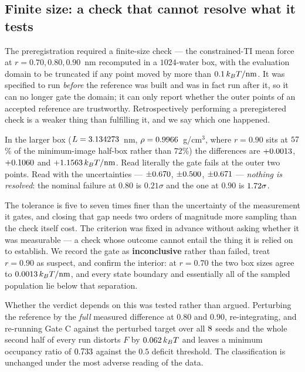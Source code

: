 \subsection{Finite size: a check that cannot resolve what it tests}

The preregistration required a finite-size check --- the constrained-TI mean force at
$r = 0.70, 0.80, 0.90$~nm recomputed in a $1024$-water box, with the evaluation domain to be
truncated if any point moved by more than $0.1\,k_BT/\text{nm}$. It was specified to run
\emph{before} the reference was built and was in fact run after it, so it can no longer gate the
domain; it can only report whether the outer points of an accepted reference are trustworthy.
Retrospectively performing a preregistered check is a weaker thing than fulfilling it, and we say
which one happened.

In the larger box ($L = 3.134273$~nm, $\rho = 0.9966$~g/cm$^3$, where $r = 0.90$ sits at
$57$\% of the minimum-image half-box rather than $72$\%) the differences are
$+0.0013$, $+0.1060$ and $+1.1563\,k_BT/\text{nm}$. Read literally the
gate fails at the outer two points. Read with the uncertainties --- $\pm0.670$,
$\pm0.500$, $\pm0.671$ --- \emph{nothing is resolved}: the nominal failure at
$0.80$ is $0.21\sigma$ and the one at $0.90$ is $1.72\sigma$.

The tolerance is five to seven times finer than the uncertainty of the measurement it gates, and
closing that gap needs two orders of magnitude more sampling than the check itself cost. The
criterion was fixed in advance without asking whether it was measurable --- a check whose outcome
cannot entail the thing it is relied on to establish. We record the gate as \textbf{inconclusive}
rather than failed, treat $r = 0.90$ as suspect, and confirm the interior: at $r = 0.70$ the two
box sizes agree to $0.0013\,k_BT/\text{nm}$, and every state boundary and essentially all
of the sampled population lie below that separation.

Whether the verdict depends on this was tested rather than argued. Perturbing the reference by
the \emph{full} measured difference at $0.80$ and $0.90$, re-integrating, and re-running Gate C
against the perturbed target over all $8$ seeds and the whole second half of every run
distorts $F$ by $0.062\,k_BT$ and leaves a minimum occupancy ratio of
$0.733$ against the $0.5$ deficit threshold. The classification is unchanged under the
most adverse reading of the data.

